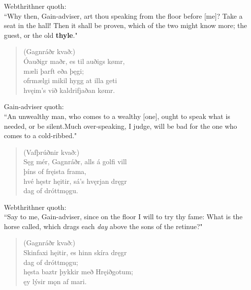 \bvb Webthrithner quoth: \\ “Why then, Gain-adviser, art thou speaking from the floor before [me]? Take a seat in the hall! Then it shall be proven, which of the two might know more; the guest, or the old \textbf{thyle}." \\

\begin{verse}
(Gagnráðr kvað:) \\%
\bva Óauðigr maðr, \hld es til auðigs kømr, \\%
\ind mæli þarft eða þęgi; \\%
ofrmælgi mikil \hld hygg at illa geti \\%
\ind hvęim's við kaldrifjaðan kømr.\\%
\end{verse}

\bvb Gain-adviser quoth: \\ “An unwealthy man, who comes to a wealthy [one], ought to speak what is needed, or be silent.\footnotemark[14] Much over-speaking\footnotemark[15], I judge, will be bad for the one who comes to a cold-ribbed\footnotemark[16] [man]." \\

\begin{verse}
(Vafþrúðnir kvað:) \\%
\bva Sęg mér, Gagnráðr, \hld alls á golfi vill \\%
\ind þíns of fręista frama, \\%
hvé hęstr hęitir, \hld sá's hvęrjan dręgr \\%
\ind dag of dróttmǫgu.\\%
\end{verse}

\bvb Webthrithner quoth: \\ “Say to me, Gain-adviser, since on the floor I will to try thy fame: What is the horse called, which drags each \emph{day} above the sons of the retinue\footnotemark[20]?" \\

\begin{verse}
(Gagnráðr kvað:) \\%
\bva Skinfaxi hęitir, \hld es hinn skíra dręgr \\%
\ind dag of dróttmǫgu; \\%
hęsta baztr \hld þykkir með Hręiðgotum; \\%
\ind ęy lýsir mǫn af mari.\\%
\end{verse}


